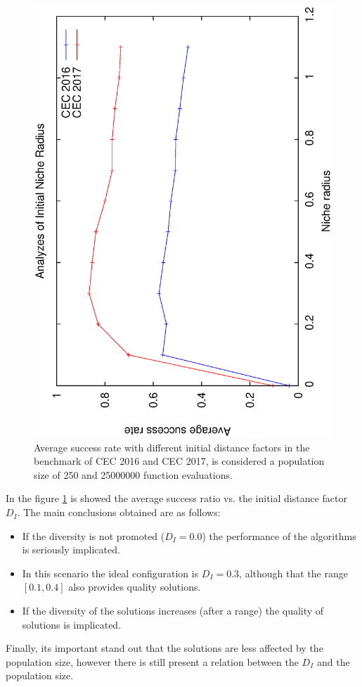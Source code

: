 \begin{figure}[t]
\centering
  \includegraphics[scale=0.3, angle=-90]{img/Tuning_CEC.eps}
\caption{Average success rate with different initial distance factors in the benchmark of CEC 2016 and CEC 2017, is considered a population size of 250 and 25000000 function evaluations.}
\label{fig:one}
\end{figure}

In the figure \ref{fig:one} is showed the average success ratio vs. the initial distance factor $D_I$.
%
The main conclusions obtained are as follows:
\begin{itemize}
\item If the diversity is not promoted ($D_I = 0.0 $) the performance of the algorithms is seriously implicated.
\item In this scenario the ideal configuration is $D_I=0.3$, although that the range $[0.1, 0.4]$ also provides quality solutions.
\item If the diversity of the solutions increases (after a range) the quality of solutions is implicated.
\end{itemize}

Finally, its important stand out that the solutions are less affected by the population size, however there is still present a relation between the $D_I$ and the population size.
%

